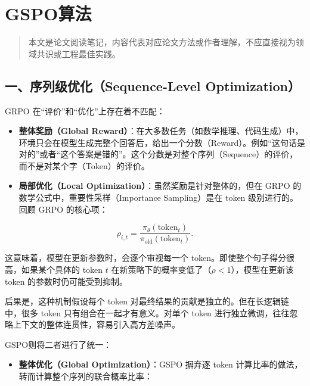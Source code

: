 \setcounter{section}{2}

\hypertarget{gspoux7b97ux6cd5}{%
\section{GSPO算法}\label{gspoux7b97ux6cd5}}

\begin{quote}
本文是论文阅读笔记，内容代表对应论文方法或作者理解，不应直接视为领域共识或工程最佳实践。
\end{quote}

\hypertarget{ux4e00ux5e8fux5217ux7ea7ux4f18ux5316sequence-level-optimization}{%
\subsection{一、序列级优化（Sequence-Level Optimization）}\label{ux4e00ux5e8fux5217ux7ea7ux4f18ux5316sequence-level-optimization}}

GRPO 在``评价''和``优化''上存在着不匹配：

\begin{itemize}
\tightlist
\item
  \textbf{整体奖励（Global Reward）}：在大多数任务（如数学推理、代码生成）中，环境只会在模型生成完整个回答后，给出一个分数（Reward）。例如``这句话是对的''或者``这个答案是错的''。这个分数是对整个序列（Sequence）的评价，而不是对某个字（Token）的评价。
\item
{}
  \textbf{局部优化（Local Optimization）}：虽然奖励是针对整体的，但在 GRPO 的数学公式中，重要性采样（Importance Sampling）是在 token 级别进行的。回顾 GRPO 的核心项：
\end{itemize}

\[
\rho_{i,t}
=
\frac{\pi_\theta(\mathrm{token}_t)}
{\pi_{\mathrm{old}}(\mathrm{token}_t)}.
\]

这意味着，模型在更新参数时，会逐个审视每一个 token。即使整个句子得分很高，如果某个具体的 token \(t\) 在新策略下的概率变低了（\(\rho<1\)），模型在更新该 token 的参数时仍可能受到抑制。

后果是，这种机制假设每个 token 对最终结果的贡献是独立的。但在长逻辑链中，很多 token 只有组合在一起才有意义。对单个 token 进行独立微调，往往忽略上下文的整体连贯性，容易引入高方差噪声。

GSPO则将二者进行了统一：

\begin{itemize}
\tightlist
\item
{}
  \textbf{整体优化（Global Optimization）}：GSPO 摒弃逐 token 计算比率的做法，转而计算整个序列的联合概率比率：
\end{itemize}

